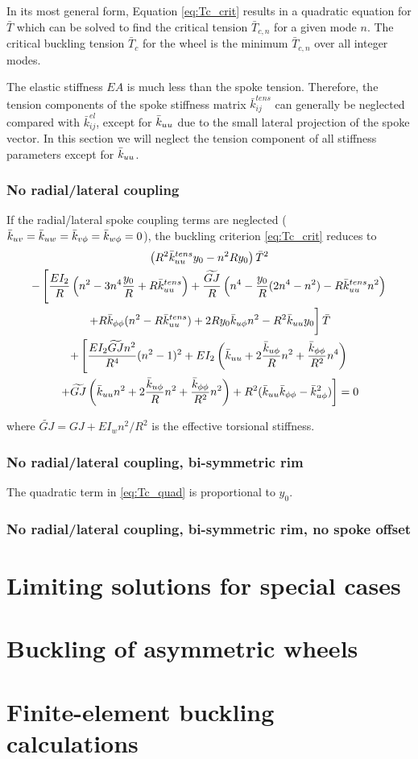 \documentclass[\rootdir/thesis.tex]{subfiles}
\begin{document}
In its most general form, Equation \eqref{eq:Tc_crit} results in a quadratic equation for $\bar{T}$ which can be solved to find the critical tension $\bar{T}_{c,n}$ for a given mode $n$. The critical buckling tension $\bar{T}_c$ for the wheel is the minimum $\bar{T}_{c,n}$ over all integer modes.

The elastic stiffness $EA$ is much less than the spoke tension. Therefore, the tension components of the spoke stiffness matrix $\bar{k}_{ij}^{tens}$ can generally be neglected compared with $\bar{k}_{ij}^{el}$, except for $\bar{k}_{uu}$ due to the small lateral projection of the spoke vector. In this section we will neglect the tension component of all stiffness parameters except for $\bar{k}_{uu}$.

\subsubsection{No radial/lateral coupling}
If the radial/lateral spoke coupling terms are neglected ($\bar{k}_{uv}=\bar{k}_{uw}=\bar{k}_{v\phi}=\bar{k}_{w\phi}=0$), the buckling criterion \eqref{eq:Tc_crit} reduces to
\begin{multline}
\label{eq:Tc_quad}
\left(R^2\bar{k}_{uu}^{tens}y_0 - n^2Ry_0 \right)\bar{T}^2\\
-\left[\frac{EI_2}{R}\left(n^2 - 3n^4 \frac{y_0}{R} + R\bar{k}_{uu}^{tens}\right)
       +\frac{\widetilde{GJ}}{R}\left(n^4 - \frac{y_0}{R}(2n^4 - n^2) - R\bar{k}_{uu}^{tens}n^2\right) \right.\\
       \left. +R\bar{k}_{\phi\phi} (n^2 - R\bar{k}_{uu}^{tens}) + 2Ry_0\bar{k}_{u\phi} n^2 - R^2\bar{k}_{uu} y_0 \vphantom{\frac12} \right]\bar{T}\\
+\left[\frac{EI_2 \widetilde{GJ} n^2}{R^4}(n^2-1)^2
	   +EI_2\left(\bar{k}_{uu} + 2\frac{\bar{k}_{u\phi}}{R}n^2 + \frac{\bar{k}_{\phi\phi}}{R^2}n^4\right) \right.\\
	   \left. +\widetilde{GJ}\left(\bar{k}_{uu} n^2 + 2\frac{\bar{k}_{u\phi}}{R}n^2 + \frac{\bar{k}_{\phi\phi}}{R^2}n^2\right)
	   +R^2(\bar{k}_{uu}\bar{k}_{\phi\phi} - \bar{k}_{u\phi}^2)\right] = 0
\end{multline}

where $\widetilde{GJ} = GJ + EI_wn^2/R^2$ is the effective torsional stiffness.

\subsubsection{No radial/lateral coupling, bi-symmetric rim}
The quadratic term in \eqref{eq:Tc_quad} is proportional to $y_0$.

\subsubsection{No radial/lateral coupling, bi-symmetric rim, no spoke offset}

\section{Limiting solutions for special cases}

\section{Buckling of asymmetric wheels}

\section{Finite-element buckling calculations}
\end{document}
